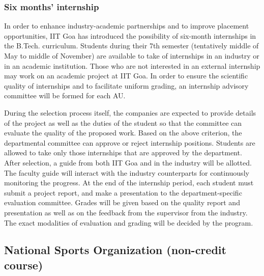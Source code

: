 \subsubsection{Six months' internship}

In order to enhance industry-academic partnerships and to improve placement opportunities, IIT Goa has introduced the possibility of six-month internships in the B.Tech. curriculum. Students during their 7th semester (tentatively middle of May to middle of November) are available to take of internships in an industry or in an academic institution. Those who are not interested in an external internship may work on an academic project at IIT Goa. In order to ensure the scientific quality of internships and to facilitate uniform grading, an internship advisory committee will be formed for each AU.

During the selection process itself, the companies are expected to provide details of the project as well as the duties of the student so that the committee can evaluate the quality of the proposed work. Based on the above criterion, the departmental committee can approve or reject internship positions. Students are allowed to take only those internships that are approved by the department. After selection, a guide from both IIT Goa and in the industry will be allotted. The faculty guide will interact with the industry counterparts for continuously monitoring the progress. At the end of the internship period, each student must submit a project report, and make a presentation to the department-specific evaluation committee. Grades will be given based on the quality report and presentation as well as on the feedback from the supervisor from the industry. The exact modalities of evaluation and grading will be decided by the program.

\subsection{National Sports Organization (non-credit course)}

